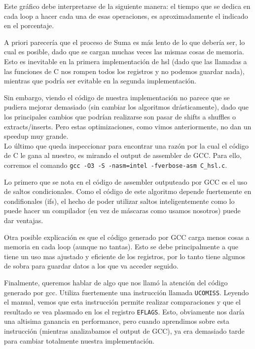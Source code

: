 Este gráfico debe interpretarse de la siguiente manera: el tiempo que se dedica en cada loop a hacer cada una de esas operaciones, es aproximadamente el indicado en el porcentaje.

A priori parecería que el proceso de Suma es más lento de lo que debería ser, lo cual es posible, dado que se cargan muchas veces las mismas cosas de memoria. Esto es inevitable en la primera implementación de hsl (dado que las llamadas a las funciones de C nos rompen todos los registros y no podemos guardar nada), mientras que podría ser evitable en la segunda implementación.

Sin embargo, viendo el código de nuestra implementación no parece que se pudiera mejorar demasiado (sin cambiar los algoritmos drásticamente), dado que los principales cambios que podrían realizarse son pasar de shifts a shuffles o extracts/inserts. Pero estas optimizaciones, como vimos anteriormente, no dan un speedup muy grande.
\\

Lo último que queda inspeccionar para encontrar una razón por la cual el código de C le gana al nuestro, es mirando el output de assembler de GCC. Para ello, corremos el comando \texttt{gcc -O3 -S -nasm=intel -fverbose-asm C\_hsl.c}.

Lo primero que se nota en el código de assembler outputeado por GCC es el uso de saltos condicionales. Como el código de este algoritmo depende fuertemente en condifionales (ifs), el hecho de poder utilizar saltos inteligentemente como lo puede hacer un compilador (en vez de máscaras como usamos nosotros) puede dar ventajas.

Otra posible explicación es que el código generado por GCC carga menos cosas a memoria en cada loop (aunque no tantas). Esto se debe principalmente a que tiene un uso mas ajustado y eficiente de los registros, por lo tanto tiene algunos de sobra para guardar datos a los que va acceder seguido.

Finalmente, queremos hablar de algo que nos llamó la atención del código generado por gcc. Utiliza fuertemente una instrucción llamada \texttt{UCOMISS}. Leyendo el manual, vemos que esta instrucción permite realizar comparaciones y que el resultado se vea plasmado en los el registro \texttt{EFLAGS}. Esto, obviamente nos daría una altisima ganancia en performance, pero cuando aprendimos sobre esta instrucción (mientras analizabamos el output de GCC), ya era demasiado tarde para cambiar totalmente nuestra implementación.
\\

